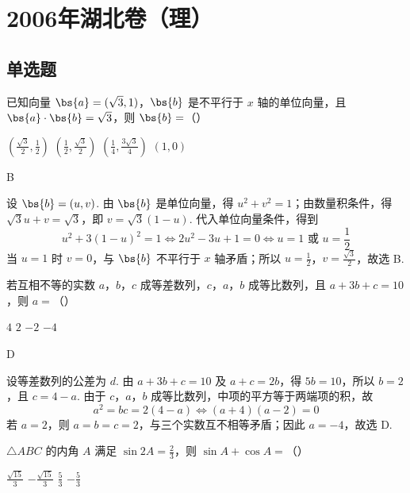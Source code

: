 \chapter{2006年湖北卷（理）}
\section{单选题}
\begin{problem}
已知向量 \(\bs{a} = (\sqrt{3}, 1)\)，\(\bs{b}\) 是不平行于 \(x\) 轴的单位向量，且 \(\bs{a} \cdot \bs{b} = \sqrt{3}\)，则 \(\bs{b} =\)（\quad）

\choices
    {\(\left(\frac{\sqrt{3}}{2}, \frac{1}{2}\right)\)}
    {\(\left(\frac{1}{2}, \frac{\sqrt{3}}{2}\right)\)}
    {\(\left(\frac{1}{4}, \frac{3\sqrt{3}}{4}\right)\)}
    {\(\left(1,0\right)\)}
\end{problem}

\begin{answer}
B
\end{answer}

\begin{solution}
设 \(\bs{b}=(u,v)\). 由 \(\bs{b}\) 是单位向量，得 \(u^{2}+v^{2}=1\)；由数量积条件，得 \(\sqrt{3}u+v=\sqrt{3}\)，即 \(v=\sqrt{3}(1-u)\). 代入单位向量条件，得到
\[
u^{2}+3(1-u)^{2}=1\Longleftrightarrow 2u^{2}-3u+1=0\Longleftrightarrow u=1\text{ 或 }u=\frac{1}{2}
\]
当 \(u=1\) 时 \(v=0\)，与 \(\bs{b}\) 不平行于 \(x\) 轴矛盾；所以 \(u=\frac{1}{2}\)，\(v=\frac{\sqrt{3}}{2}\)，故选 B.
\end{solution}

\begin{problem}
若互相不等的实数 \(a\)，\(b\)，\(c\) 成等差数列，\(c\)，\(a\)，\(b\) 成等比数列，且 \(a + 3b + c = 10\)，则 \(a =\)（\quad）

\choices
    {\(4\)}
    {\(2\)}
    {\(-2\)}
    {\(-4\)}
\end{problem}

\begin{answer}
D
\end{answer}

\begin{solution}
设等差数列的公差为 \(d\). 由 \(a+3b+c=10\) 及 \(a+c=2b\)，得 \(5b=10\)，所以 \(b=2\)，且 \(c=4-a\). 由于 \(c\)，\(a\)，\(b\) 成等比数列，中项的平方等于两端项的积，故
\[
a^{2}=bc=2(4-a)\Longleftrightarrow (a+4)(a-2)=0
\]
若 \(a=2\)，则 \(a=b=c=2\)，与三个实数互不相等矛盾；因此 \(a=-4\)，故选 D.
\end{solution}

\begin{problem}
\(\triangle ABC\) 的内角 \(A\) 满足 \(\sin 2A = \frac{2}{3}\)，则 \(\sin A + \cos A =\)（\quad）

\choices
    {\(\frac{\sqrt{15}}{3}\)}
    {\(-\frac{\sqrt{15}}{3}\)}
    {\(\frac{5}{3}\)}
    {\(-\frac{5}{3}\)}
\end{problem}

